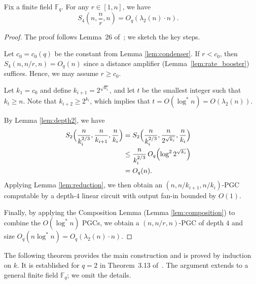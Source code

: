 \documentclass[11pt]{article}
\theoremstyle{named}
\begin{document}
\begin{lemma} 
\label{lem:depth4}
Fix a finite field $\mathbb{F}_q$. For any $r \in [1, n]$, we have
\[
S_4\left(n, \frac{n}{r}, n\right) = O_q\left(\lambda_2(n)\cdot n\right).
\]
\end{lemma}
\begin{proof}
The proof follows Lemma~26 of~\cite{GHK+12}; we sketch the key steps.


Let $c_0 = c_0(q)$ be the constant from Lemma \ref{lem:condenser}.  
If $r < c_0$, then $S_4(n, n/r, n) = O_q(n)$ since a distance amplifier 
(Lemma~\ref{lem:rate_booster}) suffices.
Hence, we may assume $r \ge c_0$.  

Let $k_1 = c_0$ and define $k_{i+1} = 2^{\sqrt{k_i}}$, and let $t$ be the smallest integer such that $k_t \ge n$.  
Note that $k_{i+2} \ge 2^{k_i}$, which implies that $t = O(\log^* n) = O(\lambda_2(n))$.

By Lemma \ref{lem:depth2}, we have
\begin{align*}
S_2\Bigl(\frac{n}{k_i^{2/3}}, \frac{n}{k_{i+1}}, \frac{n}{k_i}\Bigr) 
&= S_2\Bigl(\frac{n}{k_i^{2/3}}, \frac{n}{2^{\sqrt{k_i}}}, \frac{n}{k_i}\Bigr) \\
&\le \frac{n}{k_i^{2/3}} \, O_q\Bigl(\log^2 2^{\sqrt{k_i}}\Bigr) \\
&= O_q(n).
\end{align*}
Applying Lemma \ref{lem:reduction}, we then obtain an $(n, n/k_{i+1}, n/k_i)$-PGC computable by a depth-$4$ linear circuit with output fan-in bounded by $O(1)$.

Finally, by applying the Composition Lemma (Lemma \ref{lem:composition}) to combine the $O(\log^* n)$ PGCs, we obtain a $(n, n/r, n)$-PGC of depth $4$ and size $O_q(n \log^* n) = O_q(\lambda_2(n) \cdot n)$.
\end{proof}


The following theorem provides the main construction and is proved by induction on $k$. It is established for $q = 2$ in Theorem~3.13 of~\cite{drucker2023minimum}. The argument extends to a general finite field $\mathbb{F}_q$; we omit the details.
\end{document}
